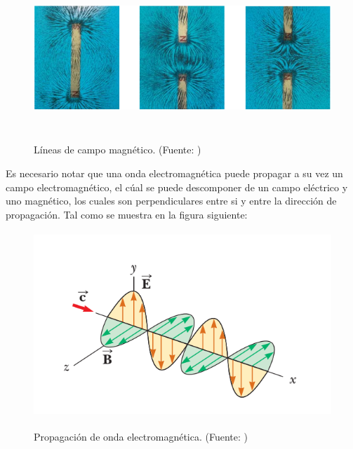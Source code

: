 \begin{figure}[H]
\centering
\includegraphics[height=5.5cm]{Imagenes/camposmag.png}\label{fig:Ejemplos de campos magneticos}
\caption{Líneas de campo magnético. (Fuente: \cite{serway2015fisica})}
\end{figure}
Es necesario notar que una onda electromagnética puede propagar a su vez un campo electromagnético, el cúal se puede descomponer de un campo eléctrico y uno magnético, los cuales son perpendiculares entre si y entre la dirección de propagación. Tal como se muestra en la figura siguiente:
\begin{figure}[H]
\centering
\includegraphics[height=7cm]{Imagenes/ondaelectromagneticas.png}\label{fig:Onda electromagnetica}
\caption{Propagación de onda electromagnética. (Fuente: \cite{serway2015fisica})}
\end{figure}
